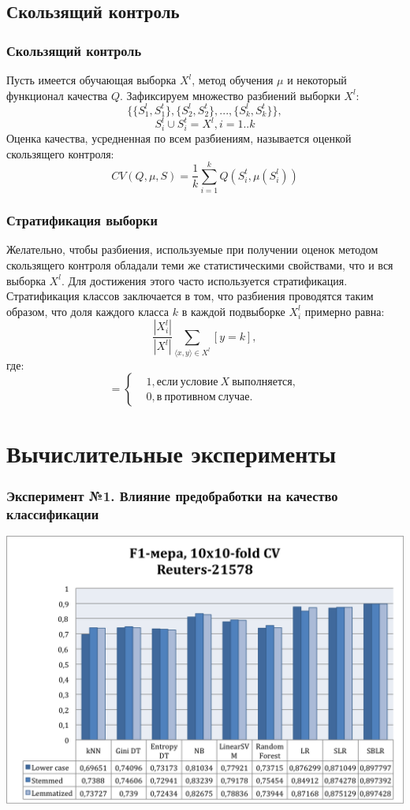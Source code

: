 \documentclass{beamer}
\begin{document}
\subsection{Скользящий контроль}
\begin{frame}
\frametitle{Скользящий контроль}
	Пусть имеется обучающая выборка $X^l$, метод обучения $\mu$ и некоторый функционал качества $Q$. Зафиксируем множество разбиений выборки $X^l$:
	$$\{\{S_1^l,S_1^t\},\{S_2^l,S_2^t\},...,\{S_k^l,S_k^t\}\},$$
	$$S_i^l \cup S_i^t = X^l, i=1..k$$
	Оценка качества, усредненная по всем разбиениям, называется оценкой скользящего контроля:
	$$CV(Q,\mu,S)=\frac{1}{k}\sum\limits_{i=1}^{k}Q(S_i^t,\mu(S_i^l))$$
\end{frame}

\begin{frame}
\frametitle{Стратификация выборки}
	Желательно, чтобы разбиения, используемые при получении оценок методом скользящего контроля обладали теми же статистическими свойствами, что и вся выборка $X^l$. Для достижения этого часто используется стратификация.
	\newline
	\newline
	Стратификация классов заключается в том, что разбиения проводятся таким образом, что доля каждого класса $k$ в каждой подвыборке $X_i^l$ примерно равна:
	$$\frac{|X_i^l|}{|X^l|}\sum\limits_{\langle x,y \rangle \in X^l}^{}[y=k],$$
	где:\\
	\begin{equation*}
	[X]=
	\begin{cases}
	&1, если\ условие\ X\ выполняется,\\
	&0, в\ противном\ случае.
	\end{cases}
	\end{equation*}
\end{frame}

\section{Вычислительные эксперименты}
\begin{frame}
\frametitle{Эксперимент №1. Влияние предобработки на качество классификации}
\begin{center}
    \includegraphics[width=\linewidth,height=0.7\textheight,align=\center,keepaspectratio]{reuters-preprocessing.png}
\end{center}
\end{frame}
\end{document}

